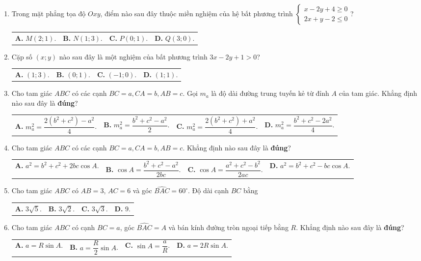 \documentclass[12pt,a4paper]{article}
\makeatletter
\newcommand{\four}[4]{\par\noindent\begin{tabularx}{\linewidth}{@{}*{4}{>{\raggedright\arraybackslash}X}@{}}\textbf{A.} #1&\textbf{B.} #2&\textbf{C.} #3&\textbf{D.} #4\end{tabularx}}
\makeatother
\begin{document}
\begin{enumerate}
\item Trong mặt phẳng tọa độ $Oxy$, điểm nào sau đây thuộc miền nghiệm của hệ bất phương trình $\begin{cases} x - 2y + 4 \ge 0 \\ 2x + y - 2 \le 0 \end{cases}$?
\four{$M(2; 1)$.}{$N(1; 3)$.}{$P(0; 1)$.}{$Q(3; 0)$.}

\item Cặp số $(x; y)$ nào sau đây là một nghiệm của bất phương trình $3x - 2y + 1 > 0$?
\four{$(1; 3)$.}{$(0; 1)$.}{$(-1; 0)$.}{$(1; 1)$.}

\item Cho tam giác $ABC$ có các cạnh $BC = a, CA = b, AB = c$. Gọi $m_a$ là độ dài đường trung tuyến kẻ từ đỉnh $A$ của tam giác. Khẳng định nào sau đây là \textbf{đúng}?
\four{$m_a^2 = \dfrac{2(b^2 + c^2) - a^2}{4}$.}{$m_a^2 = \dfrac{b^2 + c^2 - a^2}{2}$.}{$m_a^2 = \dfrac{2(b^2 + c^2) + a^2}{4}$.}{$m_a^2 = \dfrac{b^2 + c^2 - 2a^2}{4}$.}

\item Cho tam giác $ABC$ có các cạnh $BC = a, CA = b, AB = c$. Khẳng định nào sau đây là \textbf{đúng}?
\four{$a^2 = b^2 + c^2 + 2bc \cos A$.}{$\cos A = \dfrac{b^2 + c^2 - a^2}{2bc}$.}{$\cos A = \dfrac{a^2 + c^2 - b^2}{2ac}$.}{$a^2 = b^2 + c^2 - bc \cos A$.}

\item Cho tam giác $ABC$ có $AB = 3$, $AC = 6$ và góc $\widehat{BAC} = 60^\circ$. Độ dài cạnh $BC$ bằng
\four{$3\sqrt{5}$.}{$3\sqrt{2}$.}{$3\sqrt{3}$.}{$9$.}

\item Cho tam giác $ABC$ có cạnh $BC = a$, góc $\widehat{BAC} = A$ và bán kính đường tròn ngoại tiếp bằng $R$. Khẳng định nào sau đây là \textbf{đúng}?
\four{$a = R \sin A$.}{$a = \dfrac{R}{2} \sin A$.}{$\sin A = \dfrac{a}{R}$.}{$a = 2R \sin A$.}
\end{enumerate}
\end{document}
